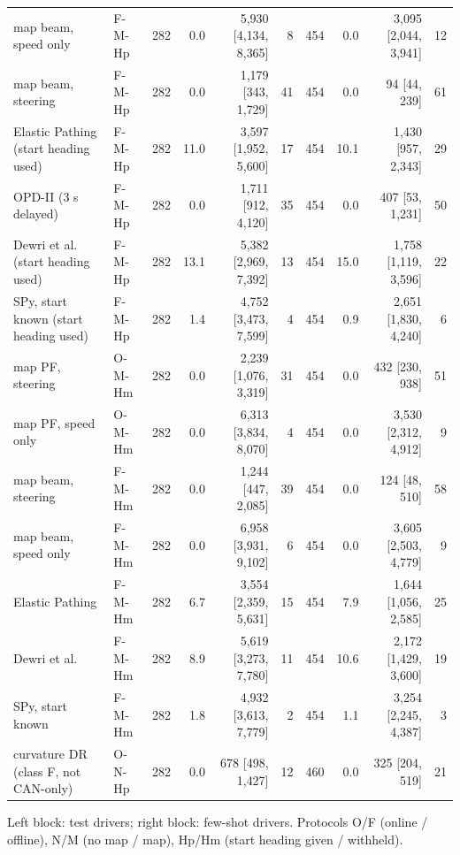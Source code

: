 \begin{table}[t]
\begin{tabular}{llrrrrrrrr}
map beam, speed only & F-M-Hp & 282 & 0.0 & 5{,}930 [4{,}134, 8{,}365] & 8 & 454 & 0.0 & 3{,}095 [2{,}044, 3{,}941] & 12 \\
map beam, steering & F-M-Hp & 282 & 0.0 & 1{,}179 [343, 1{,}729] & 41 & 454 & 0.0 & 94 [44, 239] & 61 \\
Elastic Pathing (start heading used) & F-M-Hp & 282 & 11.0 & 3{,}597 [1{,}952, 5{,}600] & 17 & 454 & 10.1 & 1{,}430 [957, 2{,}343] & 29 \\
OPD-II (3 s delayed) & F-M-Hp & 282 & 0.0 & 1{,}711 [912, 4{,}120] & 35 & 454 & 0.0 & 407 [53, 1{,}231] & 50 \\
Dewri et al. (start heading used) & F-M-Hp & 282 & 13.1 & 5{,}382 [2{,}969, 7{,}392] & 13 & 454 & 15.0 & 1{,}758 [1{,}119, 3{,}596] & 22 \\
SPy, start known (start heading used) & F-M-Hp & 282 & 1.4 & 4{,}752 [3{,}473, 7{,}599] & 4 & 454 & 0.9 & 2{,}651 [1{,}830, 4{,}240] & 6 \\
map PF, steering & O-M-Hm & 282 & 0.0 & 2{,}239 [1{,}076, 3{,}319] & 31 & 454 & 0.0 & 432 [230, 938] & 51 \\
map PF, speed only & O-M-Hm & 282 & 0.0 & 6{,}313 [3{,}834, 8{,}070] & 4 & 454 & 0.0 & 3{,}530 [2{,}312, 4{,}912] & 9 \\
map beam, steering & F-M-Hm & 282 & 0.0 & 1{,}244 [447, 2{,}085] & 39 & 454 & 0.0 & 124 [48, 510] & 58 \\
map beam, speed only & F-M-Hm & 282 & 0.0 & 6{,}958 [3{,}931, 9{,}102] & 6 & 454 & 0.0 & 3{,}605 [2{,}503, 4{,}779] & 9 \\
Elastic Pathing & F-M-Hm & 282 & 6.7 & 3{,}554 [2{,}359, 5{,}631] & 15 & 454 & 7.9 & 1{,}644 [1{,}056, 2{,}585] & 25 \\
Dewri et al. & F-M-Hm & 282 & 8.9 & 5{,}619 [3{,}273, 7{,}780] & 11 & 454 & 10.6 & 2{,}172 [1{,}429, 3{,}600] & 19 \\
SPy, start known & F-M-Hm & 282 & 1.8 & 4{,}932 [3{,}613, 7{,}779] & 2 & 454 & 1.1 & 3{,}254 [2{,}245, 4{,}387] & 3 \\
curvature DR (class F, not CAN-only) & O-N-Hp & 282 & 0.0 & 678 [498, 1{,}427] & 12 & 460 & 0.0 & 325 [204, 519] & 21 \\
\bottomrule\end{tabular}
\par\smallskip\raggedright Left block: test drivers; right block: few-shot drivers. Protocols O/F (online / offline), N/M (no map / map), Hp/Hm (start heading given / withheld).
\end{table}
